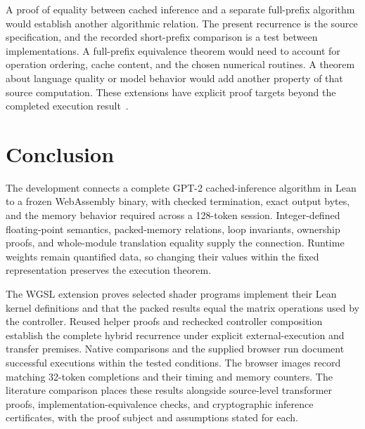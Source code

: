 A proof of equality between cached inference and a separate full-prefix algorithm would establish another algorithmic relation.  The present recurrence is the source specification, and the recorded short-prefix comparison is a test between implementations.  A full-prefix equivalence theorem would need to account for operation ordering, cache content, and the chosen numerical routines.  A theorem about language quality or model behavior would add another property of that source computation.  These extensions have explicit proof targets beyond the completed execution result~\cite{cached,testcode}.

\section{Conclusion}

The development connects a complete GPT-2 cached-inference algorithm in Lean to a frozen WebAssembly binary, with checked termination, exact output bytes, and the memory behavior required across a 128-token session.  Integer-defined floating-point semantics, packed-memory relations, loop invariants, ownership proofs, and whole-module translation equality supply the connection.  Runtime weights remain quantified data, so changing their values within the fixed representation preserves the execution theorem.

The WGSL extension proves selected shader programs implement their Lean kernel definitions and that the packed results equal the matrix operations used by the controller.  Reused helper proofs and rechecked controller composition establish the complete hybrid recurrence under explicit external-execution and transfer premises.  Native comparisons and the supplied browser run document successful executions within the tested conditions.  The browser images record matching 32-token completions and their timing and memory counters.  The literature comparison places these results alongside source-level transformer proofs, implementation-equivalence checks, and cryptographic inference certificates, with the proof subject and assumptions stated for each.
